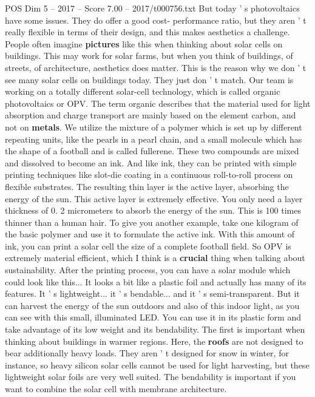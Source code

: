 \begin{textsample}{POS Dim 5 – 2017 – Score 7.00 – 2017/t000756.txt}
But today ' s photovoltaics have some issues.
They do offer a good cost- performance ratio, but they aren ' t really flexible in terms of their design, and this makes aesthetics a challenge.
People often imagine \textbf{pictures} like this when thinking about solar cells on buildings.
This may work for solar farms, but when you think of buildings, of streets, of architecture, aesthetics does matter.
This is the reason why we don ' t see many solar cells on buildings today.
They just don ' t match.
Our team is working on a totally different solar-cell technology, which is called organic photovoltaics or OPV.
The term organic describes that the material used for light absorption and charge transport are mainly based on the element carbon, and not on \textbf{metals}.
We utilize the mixture of a polymer which is set up by different repeating units, like the pearls in a pearl chain, and a small molecule which has the shape of a football and is called fullerene.
These two compounds are mixed and dissolved to become an ink.
And like ink, they can be printed with simple printing techniques like slot-die coating in a continuous roll-to-roll process on flexible substrates.
The resulting thin layer is the active layer, absorbing the energy of the sun.
This active layer is extremely effective.
You only need a layer thickness of 0. 2 micrometers to absorb the energy of the sun.
This is 100 times thinner than a human hair.
To give you another example, take one kilogram of the basic polymer and use it to formulate the active ink.
With this amount of ink, you can print a solar cell the size of a complete football field.
So OPV is extremely material efficient, which I think is a \textbf{crucial} thing when talking about sustainability.
After the printing process, you can have a solar module which could look like this...
It looks a bit like a plastic foil and actually has many of its features.
It ' s lightweight... it ' s bendable... and it ' s semi-transparent.
But it can harvest the energy of the sun outdoors and also of this indoor light, as you can see with this small, illuminated LED.
You can use it in its plastic form and take advantage of its low weight and its bendability.
The first is important when thinking about buildings in warmer regions.
Here, the \textbf{roofs} are not designed to bear additionally heavy loads.
They aren ' t designed for snow in winter, for instance, so heavy silicon solar cells cannot be used for light harvesting, but these lightweight solar foils are very well suited.
The bendability is important if you want to combine the solar cell with membrane architecture.

\end{textsample}
